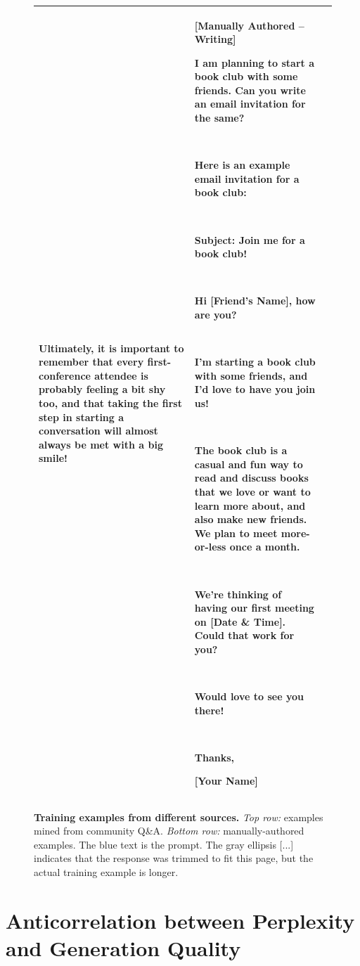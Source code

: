 \documentclass{article}
\begin{document}
\begin{figure}[p]
\begin{tabular}{@{}p{}p{}p{}@{}}
    Ultimately, it is important to remember that every first-conference attendee is probably feeling a bit shy too, and that taking the first step in starting a conversation will almost always be met with a big smile! 

    &
    \textbf{[Manually Authored -- Writing]}
    
    \textcolor[HTML]{3078BE}{\textbf{I am planning to start a book club with some friends. Can you write an email invitation for the same?}}

    ~
    
    Here is an example email invitation for a book club:

    ~

    Subject: Join me for a book club!

    ~
    
    Hi [Friend's Name], how are you?

    ~
    
    I'm starting a book club with some friends, and I'd love to have you join us!

    ~
    
    The book club is a casual and fun way to read and discuss books that we love or want to learn more about, and also make new friends. We plan to meet more-or-less once a month.

    ~
    
    We're thinking of having our first meeting on [Date \& Time]. Could that work for you?

    ~
    
    Would love to see you there!

    ~
    
    Thanks,
    
    [Your Name]
    \\
    \bottomrule
    \end{tabular}
    \caption{\textbf{Training examples from different sources.} \textit{Top row:} examples mined from community Q\&A. \textit{Bottom row:} manually-authored examples. The \textcolor[HTML]{3078BE}{blue} text is the prompt. The gray ellipsis \textcolor[HTML]{808080}{[...]} indicates that the response was trimmed to fit this page, but the actual training example is longer.}
    \label{fig:training_examples}
\end{figure}

\section{Anticorrelation between Perplexity and Generation Quality}
\label{sec:ppl}
\end{document}
